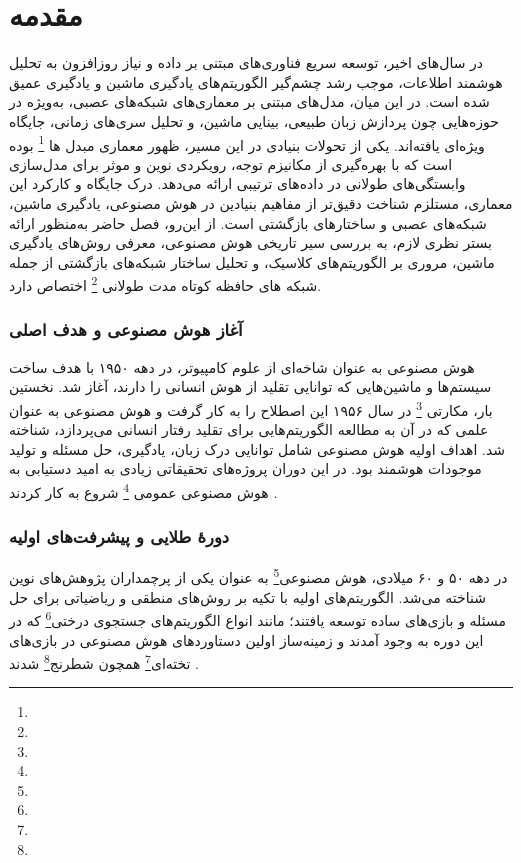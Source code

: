 \chapter{مقدمه}

در سال‌های اخیر، توسعه سریع فناوری‌های مبتنی بر داده و نیاز روزافزون به تحلیل هوشمند اطلاعات، موجب رشد چشم‌گیر الگوریتم‌های یادگیری ماشین و یادگیری عمیق شده است. در این میان، مدل‌های مبتنی بر معماری‌های شبکه‌های عصبی، به‌ویژه در حوزه‌هایی چون پردازش زبان طبیعی، بینایی ماشین، و تحلیل سری‌های زمانی، جایگاه ویژه‌ای یافته‌اند. یکی از تحولات بنیادی در این مسیر، ظهور معماری مبدل ها \footnote{} بوده است که با بهره‌گیری از مکانیزم توجه، رویکردی نوین و موثر برای مدل‌سازی وابستگی‌های طولانی در داده‌های ترتیبی ارائه می‌دهد. درک جایگاه و کارکرد این معماری، مستلزم شناخت دقیق‌تر از مفاهیم بنیادین در هوش مصنوعی، یادگیری ماشین، شبکه‌های عصبی و ساختارهای بازگشتی است. از این‌رو، فصل حاضر به‌منظور ارائه بستر نظری لازم، به بررسی سیر تاریخی هوش مصنوعی، معرفی روش‌های یادگیری ماشین، مروری بر الگوریتم‌های کلاسیک، و تحلیل ساختار شبکه‌های بازگشتی از جمله شبکه های حافظه کوتاه مدت طولانی \footnote{} اختصاص دارد.




\subsection{آغاز هوش مصنوعی و هدف اصلی}

هوش مصنوعی به عنوان شاخه‌ای از علوم کامپیوتر، در دهه ۱۹۵۰ با هدف ساخت سیستم‌ها و ماشین‌هایی که توانایی تقلید از هوش انسانی را دارند، آغاز شد. نخستین بار، مکارتی \footnote{} در سال ۱۹۵۶ این اصطلاح را به کار گرفت \cite{mccarthy1956proposal} و هوش مصنوعی به عنوان علمی که در آن به مطالعه الگوریتم‌هایی برای تقلید رفتار انسانی می‌پردازد، شناخته شد. اهداف اولیه هوش مصنوعی شامل توانایی درک زبان، یادگیری، حل مسئله و تولید موجودات هوشمند بود. در این دوران پروژه‌های تحقیقاتی زیادی به امید دستیابی به هوش مصنوعی عمومی \footnote{}
شروع به کار کردند \cite{crevier1993ai,nilsson2010quest}.

\subsection{دورهٔ طلایی و پیشرفت‌های اولیه}

در دهه ۵۰ و ۶۰ میلادی، هوش مصنوعی\footnote{} به عنوان یکی از پرچمداران پژوهش‌های نوین شناخته می‌شد. الگوریتم‌های اولیه با تکیه بر روش‌های منطقی و ریاضیاتی برای حل مسئله و بازی‌های ساده توسعه یافتند؛ مانند انواع الگوریتم‌های جستجوی درختی\footnote{} که در این دوره به وجود آمدند و زمینه‌ساز اولین دستاوردهای هوش مصنوعی در بازی‌های تخته‌ای\footnote{} همچون شطرنج\footnote{} شدند \cite{newell1959report}. 


